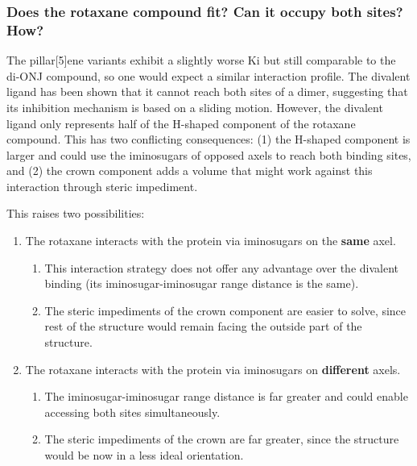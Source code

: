 \subsubsection{Does the rotaxane compound fit? Can it occupy both sites? How?}
The pillar[5]ene variants exhibit a slightly worse Ki but still comparable to the di-ONJ compound, so one would expect a similar interaction profile. The divalent ligand has been shown that it cannot reach both sites of a dimer, suggesting that its inhibition mechanism is based on a sliding motion. However, the divalent ligand only represents half of the H-shaped component of the rotaxane compound. This has two conflicting consequences: (1) the H-shaped component is larger and could use the iminosugars of opposed axels to reach both binding sites, and (2) the crown component adds a volume that might work against this interaction through steric impediment.

This raises two possibilities:

\begin{enumerate}
	\item The rotaxane interacts with the protein via iminosugars on the \textbf{same} axel.

\begin{enumerate}
	\item This interaction strategy does not offer any advantage over the divalent binding (its iminosugar-iminosugar range distance is the same).

	\item The steric impediments of the crown component are easier to solve, since rest of the structure would remain facing the outside part of the structure.


\end{enumerate}
	\item The rotaxane interacts with the protein via iminosugars on \textbf{different} axels.

\begin{enumerate}
	\item The iminosugar-iminosugar range distance is far greater and could enable accessing both sites simultaneously.

	\item The steric impediments of the crown are far greater, since the structure would be now in a less ideal orientation.
\end{enumerate}
\end{enumerate}

